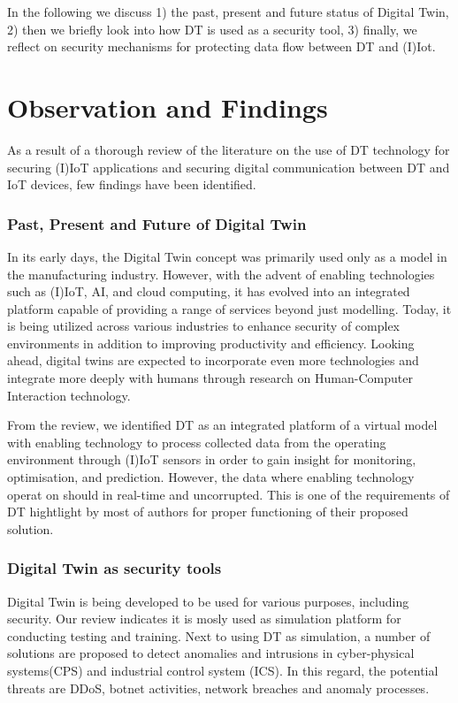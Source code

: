 In the following we discuss 1) the past, present and future status of Digital Twin, 2) then 
we briefly look into how DT is used as a security tool, 3) finally, we reflect on security mechanisms for protecting data flow between DT and (I)Iot.

\section{Observation and Findings}
As a result of a thorough review of the literature on the use of DT technology for securing (I)IoT applications and securing digital communication between DT and IoT devices, few findings have been identified.


\subsubsection{Past, Present and Future of Digital Twin}
In its early days, the Digital Twin concept was primarily used only as a model in the manufacturing industry. However, with the advent of enabling technologies such as (I)IoT, AI, and cloud computing, it has evolved into an integrated platform capable of providing a range of services beyond just modelling. Today, it is being utilized across various industries to enhance security of complex environments in addition to improving productivity and efficiency. Looking ahead, digital twins are expected to incorporate even more technologies and integrate more deeply with humans through research on Human-Computer Interaction technology.

From the review, we identified DT as an integrated platform of a virtual model with enabling technology to process collected data from the operating environment through (I)IoT sensors in order to gain insight for monitoring, optimisation, and prediction. However, the data where enabling technology operat on should in real-time and uncorrupted. This is one of the requirements of DT hightlight by most of authors for proper functioning of their proposed solution. 



\subsubsection{Digital Twin as security tools}
Digital Twin is being developed to be used for various purposes, including security. Our review indicates it is mosly used as simulation platform for conducting testing and training. Next to using DT as simulation, a number of solutions are proposed to detect anomalies and intrusions in cyber-physical systems(CPS) and industrial control system (ICS). In this regard, the potential threats are DDoS, botnet activities, network breaches and anomaly processes.   




